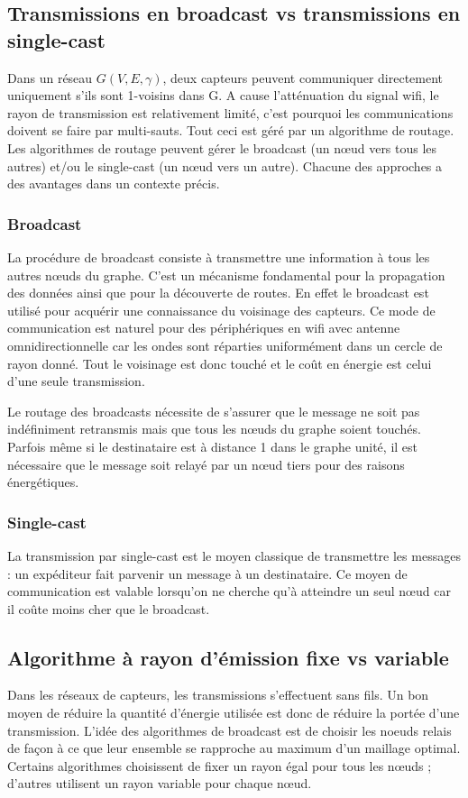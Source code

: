 \subsection{Transmissions en broadcast vs transmissions en single-cast}
Dans un réseau $G(V,E,\gamma)$, deux capteurs peuvent communiquer directement uniquement s'ils sont 1-voisins dans G. A cause l'atténuation du signal wifi, le rayon de transmission est relativement limité, c'est pourquoi les communications doivent se faire par multi-sauts. Tout ceci est géré par un algorithme de routage. Les algorithmes de routage peuvent gérer le broadcast (un nœud vers tous les autres) et/ou le single-cast (un nœud vers un autre). Chacune des approches a des avantages dans un contexte précis.

\subsubsection{Broadcast}
La procédure de broadcast consiste à transmettre une information à tous les autres nœuds du graphe. C'est un mécanisme fondamental pour la propagation des données ainsi que pour la découverte de routes. En effet le broadcast est utilisé pour acquérir une connaissance du voisinage des capteurs. Ce mode de communication est naturel pour des périphériques en wifi avec antenne omnidirectionnelle car les ondes sont réparties uniformément dans un cercle de rayon donné. Tout le voisinage est donc touché et le coût en énergie est celui d'une seule transmission.

Le routage des broadcasts nécessite de s'assurer que le message ne soit pas indéfiniment retransmis mais que tous les nœuds du graphe soient touchés. Parfois même si le destinataire est à distance 1 dans le graphe unité, il est nécessaire que le message soit relayé par un nœud tiers pour des raisons énergétiques.

\subsubsection{Single-cast}
La transmission par single-cast est le moyen classique de transmettre les messages : un expéditeur fait parvenir un message à un destinataire. Ce moyen de communication est valable lorsqu'on ne cherche qu'à atteindre un seul nœud car il coûte moins cher que le broadcast.


\subsection{Algorithme à rayon d'émission fixe vs variable}
Dans les réseaux de capteurs, les transmissions s'effectuent sans fils. Un bon moyen de réduire la quantité d'énergie utilisée est donc de réduire la portée d'une transmission. L'idée des algorithmes de broadcast est de choisir les noeuds relais de façon à ce que leur ensemble se rapproche au maximum d'un maillage optimal. Certains algorithmes choisissent de fixer un rayon égal pour tous les nœuds ; d'autres utilisent un rayon variable pour chaque nœud. 

